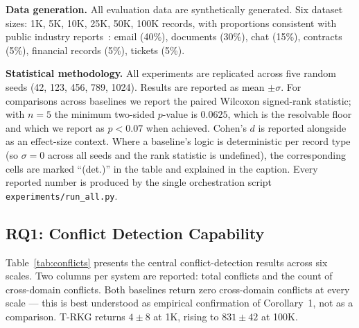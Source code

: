 \documentclass{ieeeaccess}
\begin{document}
\textbf{Data generation.} All evaluation data are synthetically generated. Six dataset sizes: 1K, 5K, 10K, 25K, 50K, 100K records, with proportions consistent with public industry reports~\cite{databerg,igrm}: email (40\%), documents (30\%), chat (15\%), contracts (5\%), financial records (5\%), tickets (5\%).

\textbf{Statistical methodology.} All experiments are replicated across five random seeds (42, 123, 456, 789, 1024). Results are reported as mean $\pm \sigma$. For comparisons across baselines we report the paired Wilcoxon signed-rank statistic; with $n=5$ the minimum two-sided $p$-value is $0.0625$, which is the resolvable floor and which we report as $p < 0.07$ when achieved. Cohen's $d$ is reported alongside as an effect-size context. Where a baseline's logic is deterministic per record type (so $\sigma=0$ across all seeds and the rank statistic is undefined), the corresponding cells are marked ``(det.)'' in the table and explained in the caption. Every reported number is produced by the single orchestration script \texttt{experiments/run\_all.py}.

\subsection{RQ1: Conflict Detection Capability}
\label{sec:rq1}

Table~\ref{tab:conflicts} presents the central conflict-detection results across six scales. Two columns per system are reported: total conflicts and the count of cross-domain conflicts. Both baselines return zero cross-domain conflicts at every scale --- this is best understood as empirical confirmation of Corollary~1, not as a comparison. T-RKG returns $4 \pm 8$ at 1K, rising to $831 \pm 42$ at 100K.
\end{document}

